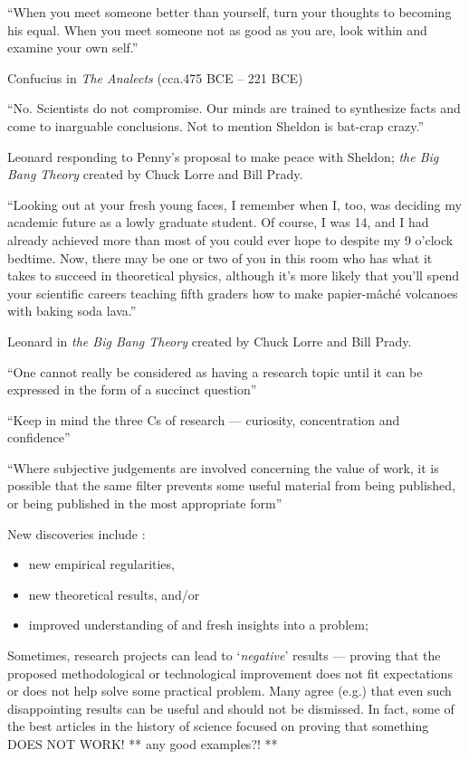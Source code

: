 ``When you meet someone better than yourself, turn your thoughts to becoming his equal. When you meet someone not as good as you are, look within and examine your own self.''

Confucius in \emph{The Analects} (cca.\@ 475 BCE -- 221 BCE)



``No. Scientists do not compromise. Our minds are trained to synthesize facts and come to inarguable conclusions. Not to mention Sheldon is bat-crap crazy.''

Leonard responding to Penny's proposal to make peace with Sheldon; \emph{the Big Bang Theory} created by Chuck Lorre and Bill Prady.


``Looking out at your fresh young faces, I remember when I, too, was deciding my academic future as a lowly graduate student. Of course, I was 14, and I had already achieved more than most of you could ever hope to despite my 9 o'clock bedtime. Now, there may be one or two of you in this room who has what it takes to succeed in theoretical physics, although it's more likely that you'll spend your scientific careers teaching fifth graders how to make papier-m\^{a}ch\'{e} volcanoes with baking soda lava.''

Leonard in \emph{the Big Bang Theory} created by Chuck Lorre and Bill Prady.


``One cannot really be considered as having a research topic until it can be expressed in the form of a succinct question''

``Keep in mind the three Cs of research --- curiosity, concentration and confidence''

``Where subjective judgements are involved concerning the value of work, it is possible that the same filter prevents some useful material from being published, or being published in the most appropriate form''

New discoveries include \citep{Creedy2008EE}:
\begin{itemize}
  \item new empirical regularities,
  \item new theoretical results, and/or
  \item improved understanding of and fresh insights into a problem;
\end{itemize}

Sometimes, research projects can lead to `\emph{negative}' results --- proving that the proposed methodological or technological improvement does not fit expectations or does not help solve some practical problem. Many agree (e.g.\@ \citet{Creedy2008EE}) that even such disappointing results can be useful and should not be dismissed. In fact, some of the best articles in the history of science focused on proving that something DOES NOT WORK! ** any good examples?! **


